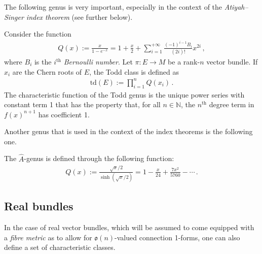     The following genus is very important, especially in the context of the \textit{Atiyah--Singer index theorem} (see further below).
    \begin{example}\label{bundle:todd_class}
        Consider the function
        \begin{gather}
            Q(x) := \frac{x}{1-e^{-x}} = 1 + \frac{x}{2} + \sum_{i=1}^{+\infty}\frac{(-1)^{i-1}B_i}{(2i)!}x^{2i}\,,
        \end{gather}
        where $B_i$ is the $i^{\text{th}}$ \textit{Bernoulli number}. Let $\pi:E\rightarrow M$ be a rank-$n$ vector bundle. If $x_i$ are the Chern roots of $E$, the Todd class is defined as
        \begin{gather}
            \mathrm{td}(E) := \prod_{i=1}^nQ(x_i)\,.
        \end{gather}
        The characteristic function of the Todd genus is the unique power series with constant term 1 that has the property that, for all $n\in\mathbb{N}$, the $n^{\text{th}}$ degree term in $f(x)^{n+1}$ has coefficient 1.
    \end{example}
    Another genus that is used in the context of the index theorems is the following one.
    \begin{example}\label{bundle:a_roof_genus}
        The $\hat{A}$-genus is defined through the following function:
        \begin{gather}
            Q(x) := \frac{\sqrt{x}/2}{\sinh(\sqrt{x}/2)} = 1 - \frac{x}{24} + \frac{7x^2}{5760} - \cdots\,.
        \end{gather}
    \end{example}

\subsection{Real bundles}

    In the case of real vector bundles, which will be assumed to come equipped with a \textit{fibre metric} as to allow for $\mathfrak{o}(n)$-valued connection 1-forms, one can also define a set of characteristic classes.


